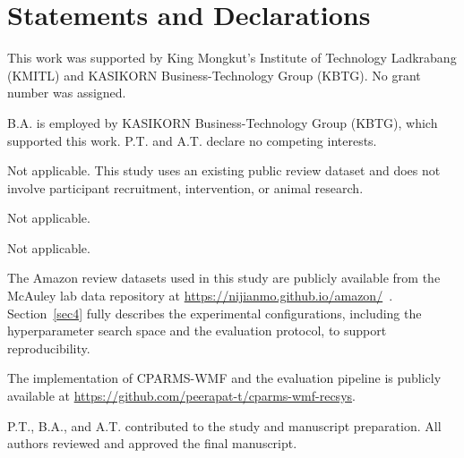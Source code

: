 \documentclass[pdflatex,sn-vancouver-num]{sn-jnl}%
\theoremstyle{thmstyleone}%
\theoremstyle{thmstyletwo}%
\theoremstyle{thmstylethree}%
\begin{document}

\section*{Statements and Declarations}

This work was supported by King Mongkut's Institute of Technology Ladkrabang (KMITL) and KASIKORN Business-Technology Group (KBTG). No grant number was assigned.

B.A. is employed by KASIKORN Business-Technology Group (KBTG), which supported this work. P.T. and A.T. declare no competing interests.

Not applicable. This study uses an existing public review dataset and does not involve participant recruitment, intervention, or animal research.

Not applicable.

Not applicable.

The Amazon review datasets used in this study are publicly available from the McAuley lab data repository at \url{https://nijianmo.github.io/amazon/}~\cite{ni2019justifying}. Section~\ref{sec4} fully describes the experimental configurations, including the hyperparameter search space and the evaluation protocol, to support reproducibility.

The implementation of CPARMS-WMF and the evaluation pipeline is publicly available at
\url{https://github.com/peerapat-t/cparms-wmf-recsys}.

P.T., B.A., and A.T. contributed to the study and manuscript preparation. All authors reviewed and approved the final manuscript.


\end{document}
